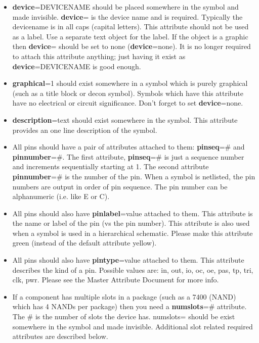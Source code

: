 \documentclass{article}
\begin{document}
\begin{itemize}
\item {\bf device}=DEVICENAME should be placed somewhere in the symbol
      and made invisible.  {\bf device}= is the device name and
      is required.  Typically the devicename is in all caps (capital
      letters).  This attribute should not be used as a label.  Use a
      separate text object for the label.  If the object is a graphic
      then {\bf device}= should be set to none ({\bf device}=none).
      It is no longer required to attach this attribute anything; just
      having it exist as {\bf device}=DEVICENAME is good enough.

\item {\bf graphical}=1 should exist somewhere in a symbol which is purely
      graphical (such as a title block or decon symbol).  Symbols which
      have this attribute have no electrical or circuit significance.
      Don't forget to set {\bf device}=none.

\item {\bf description}=text should exist somewhere in the symbol.  This 
      attribute provides an one line description of the symbol.

\item All pins should have a pair of attributes attached to them:  
      {\bf pinseq}=\# and {\bf pinnumber}=\#.  The first attribute, 
      {\bf pinseq}=\# is just a sequence number and increments sequentially
      starting at 1.  The second attribute {\bf pinnumber}=\# is the number
      of the pin.  When a symbol is netlisted, the pin numbers are output
      in order of pin sequence.  The pin number can be alphanumeric (i.e. like
      E or C).

\item All pins should also have {\bf pinlabel}=value attached to them.
      This attribute is the name or label of the pin (vs the pin number).
      This attribute is also used when a symbol is used in a hierarchical
      schematic.  Please make this attribute green (instead of the
      default attribute yellow).

\item All pins should also have {\bf pintype}=value attached to them.
      This attribute describes the kind of a pin.  Possible values are:
      in, out, io, oc, oe, pas, tp, tri, clk, pwr.  Please see the Master
      Attribute Document for more info.

\item If a component has multiple slots in a package (such as
      a 7400 (NAND) which has 4 NANDs per package) then you need a
      {\bf numslots}=\# attribute.  The \# is the number of
      slots the device has.  numslots= should be exist somewhere in
      the symbol and made invisible.  Additional slot related required
      attributes are described below.


\end{itemize}
\end{document}
